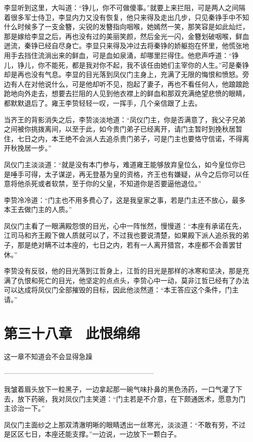 李显听到这里，大叫道：“铮儿，你不可做傻事。”就要上来拦阻，可是两人之间隔着很多军士侍卫，李显内力又没有恢复，他只来得及走出几步，只见秦铮手中不知什么时候多了一支金簪，尖锐的发簪指向咽喉，她嫣然一笑，那笑容是如此灿烂，那是嫁给李显之后，再也没有过的美丽笑颜，然后金光一闪，金簪划破咽喉，鲜血迸流，秦铮已经自尽身亡。李显只来得及冲过去将秦铮的娇躯抱在怀里，他慌张地用手去挡住流淌出来的鲜血，可是血如泉涌，却哪里拦得住。他悲声呼道：“铮儿，铮儿，你不能死，都是我对你不起，我不该任由她们主宰你的人生。”可是秦铮却是再也没有气息。李显的目光落到凤仪门主身上，充满了无限的悔恨和愤怒。旁边有人在对他说什么，可是他却听不见，抱起了妻子，再也不看任何人，他踉踉跄跄地向外走去，想要去拦阻的人见到他衣襟上的鲜血和那双充满绝望悲愤的眼睛，都默默退后了。雍王李贽轻轻一叹，一挥手，几个亲信跟了上去。

当齐王的背影消失之后，李贽淡淡地道：“凤仪门主，你是否满意了，我父子兄弟之间被你挑拨离间，以至于此，如今贵门弟子已经离开，请门主暂时到挽秋居暂住，七日之内，本王绝不会派人去追杀贵门弟子，可是门主也要恪守信诺，不得离开秋挽居一步。”

凤仪门主淡淡道：“就是没有本门参与，难道雍王能够放弃皇位么，如今皇位你已是唾手可得，太子谋逆，再无登基为皇的资格，齐王也有嫌疑，从今之后你可以任意将他杀死或者软禁，至于你的父皇，不知道你是否要逼他退位。”

李贽冷冷道：“门主也不用多费心了，这是我皇家之事，若是门主还不放心，最多本王去做门主的人质。”

凤仪门主看了一眼满殿怨恨的目光，心中一阵怅然，慢慢道：“本座有承诺在先，江司马和齐王殿下做人质就可以了，不过我也要说清楚，如果殿下派人追杀我的弟子，那是绝对瞒不过本座的，七日之内，若有一人离开猎宫，本座都不会善罢甘休。”

李贽没有反驳，他的目光落到江哲身上，江哲的目光是那样的冰寒和坚决，那是充满了仇恨和死亡的目光，他坚定的点点头，李贽心中一动，莫非江哲已经有了办法可以达成将凤仪门全部摧毁的目标，因此他淡然道：“本王答应这个条件，门主请。”

\chapter{第三十八章　此恨绵绵}

这一章不知道会不会显得急躁

——————————————————————

我皱着眉头放下一粒黑子，一边拿起那一碗气味扑鼻的黑色汤药，一口气灌了下去，放下药碗，我对凤仪门主笑道：“门主若是不介意，在下颇通医术，愿意为门主诊治一下。”

凤仪门主面纱之上那双清澈明晰的眼睛透出一丝寒光，淡淡道：“不敢有劳，不过是区区七日，本座还能支撑。”一边说，一边放下一颗白子。

